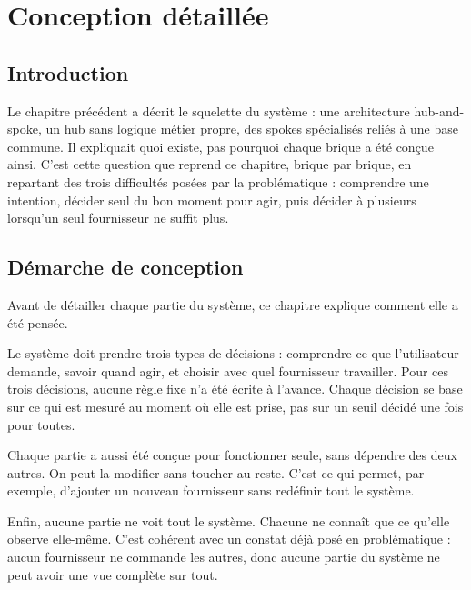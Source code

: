 \newpage
\pagestyle{fancy}

\renewcommand{\headrulewidth}{0.5pt}
\renewcommand{\footrulewidth}{0.5pt}
\chapter{Conception détaillée}\setlength{\headheight}{27.06pt}
\label{ch3}
\minitoc

\newpage
\section{Introduction}

Le chapitre précédent a décrit le squelette du système : une architecture hub-and-spoke, un hub sans logique métier propre, des spokes spécialisés reliés à une base commune. Il expliquait quoi existe, pas pourquoi chaque brique a été conçue ainsi. C'est cette question que reprend ce chapitre, brique par brique, en repartant des trois difficultés posées par la problématique : comprendre une intention, décider seul du bon moment pour agir, puis décider à plusieurs lorsqu'un seul fournisseur ne suffit plus.

\section{Démarche de conception}
\label{sec:demarche-conception}

Avant de détailler chaque partie du système, ce chapitre explique comment elle a été pensée.

Le système doit prendre trois types de décisions : comprendre ce que l'utilisateur demande, savoir quand agir, et choisir avec quel fournisseur travailler. Pour ces trois décisions, aucune règle fixe n'a été écrite à l'avance. Chaque décision se base sur ce qui est mesuré au moment où elle est prise, pas sur un seuil décidé une fois pour toutes.

Chaque partie a aussi été conçue pour fonctionner seule, sans dépendre des deux autres. On peut la modifier sans toucher au reste. C'est ce qui permet, par exemple, d'ajouter un nouveau fournisseur sans redéfinir tout le système.

Enfin, aucune partie ne voit tout le système. Chacune ne connaît que ce qu'elle observe elle-même. C'est cohérent avec un constat déjà posé en problématique : aucun fournisseur ne commande les autres, donc aucune partie du système ne peut avoir une vue complète sur tout.

